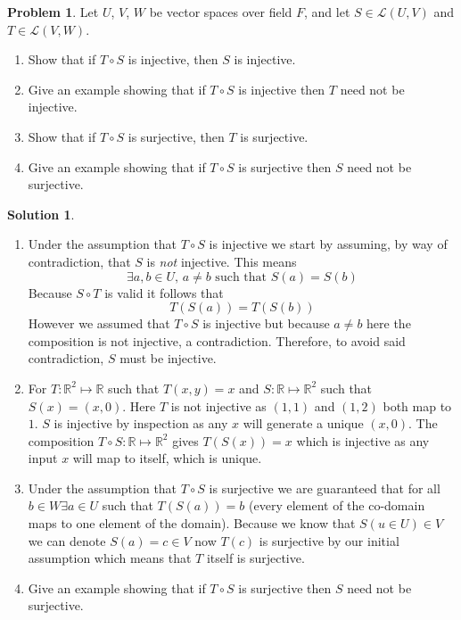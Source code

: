 \documentclass[10pt]{article}
\theoremstyle{definition}
\newtheorem{problem}{Problem}
\newtheorem{soln}{Solution}
\begin{document}
\begin{problem}
Let $U$, $V$, $W$ be vector spaces over field $F$, and let $S\in\mathcal{L}(U,V)$ and $T\in\mathcal{L}(V,W)$.
\begin{enumerate}[label=(\alph*)]
  \item Show that if $T\circ S$ is injective, then $S$ is injective.
  \item Give an example showing that if $T\circ S$ is injective then $T$ need not be injective.
  \item Show that if $T\circ S$ is surjective, then $T$ is surjective.
  \item Give an example showing that if $T\circ S$ is surjective then $S$ need not be surjective.
\end{enumerate}
\end{problem}
\begin{soln}~
  \begin{enumerate}[label=(\alph*)]
    \item Under the assumption that $T\circ S$ is injective we start by assuming, by way of contradiction, that
          $S$ is \textit{not} injective. This means
          $$\exists a,b\in U,\, a\neq b \text{ such that } S(a)=S(b)$$
          Because $S\circ T$ is valid it follows that
          $$T(S(a))=T(S(b))$$
          However we assumed that $T\circ S$ is injective but because $a\neq b$ here the composition is not injective, a contradiction.
          Therefore, to avoid said contradiction, $S$ must be injective.
    \item For $T:\mathbb{R}^2\mapsto \mathbb{R}$ such that $T(x,y)=x$ and $S:\mathbb{R}\mapsto\mathbb{R}^2$ such that $S(x)=(x,0)$.
          Here $T$ is not injective as $(1,1)$ and $(1,2)$ both map to $1$. $S$ is injective by inspection as any $x$ will generate a unique
          $(x,0)$. The composition $T\circ S: \mathbb{R}\mapsto \mathbb{R}^2$ gives $T(S(x))=x$ which is injective as any input $x$ will map to itself, which is unique.
    \item Under the assumption that $T\circ S$ is surjective we are guaranteed that for all
          $b\in W\exists a\in U$ such that $T(S(a))=b$ (every element of the co-domain maps to one element of the domain).
          Because we know that $S(u\in U)\in V$ we can denote $S(a)=c\in V$ now $T(c)$ is surjective by our initial assumption which means
          that $T$ itself is surjective.
    \item Give an example showing that if $T\circ S$ is surjective then $S$ need not be surjective.
  \end{enumerate}
\end{soln}
\end{document}
